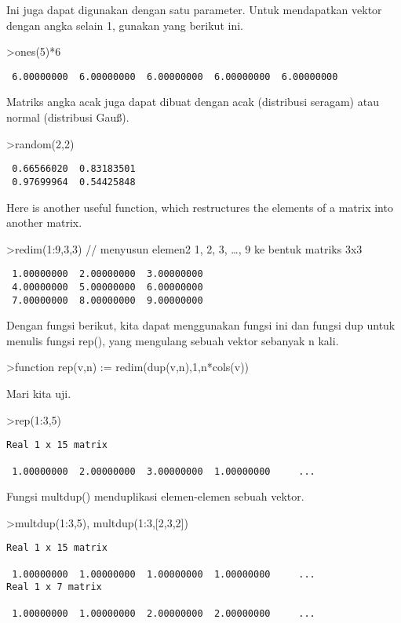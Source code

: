 \documentclass[
]{book}
\begin{document}
Ini juga dapat digunakan dengan satu parameter. Untuk mendapatkan vektor dengan angka selain 1, gunakan yang berikut ini.

\textgreater ones(5)*6

\begin{verbatim}
 6.00000000  6.00000000  6.00000000  6.00000000  6.00000000 
\end{verbatim}

Matriks angka acak juga dapat dibuat dengan acak (distribusi seragam) atau normal (distribusi Gauß).

\textgreater random(2,2)

\begin{verbatim}
 0.66566020  0.83183501 
 0.97699964  0.54425848 
\end{verbatim}

Here is another useful function, which restructures the elements of a matrix into another matrix.

\textgreater redim(1:9,3,3) // menyusun elemen2 1, 2, 3, \ldots, 9 ke bentuk matriks 3x3

\begin{verbatim}
 1.00000000  2.00000000  3.00000000 
 4.00000000  5.00000000  6.00000000 
 7.00000000  8.00000000  9.00000000 
\end{verbatim}

Dengan fungsi berikut, kita dapat menggunakan fungsi ini dan fungsi dup untuk menulis fungsi rep(), yang mengulang sebuah vektor sebanyak n kali.

\textgreater function rep(v,n) := redim(dup(v,n),1,n*cols(v))

Mari kita uji.

\textgreater rep(1:3,5)

\begin{verbatim}
Real 1 x 15 matrix

 1.00000000  2.00000000  3.00000000  1.00000000     ...
\end{verbatim}

Fungsi multdup() menduplikasi elemen-elemen sebuah vektor.

\textgreater multdup(1:3,5), multdup(1:3,{[}2,3,2{]})

\begin{verbatim}
Real 1 x 15 matrix

 1.00000000  1.00000000  1.00000000  1.00000000     ...
Real 1 x 7 matrix

 1.00000000  1.00000000  2.00000000  2.00000000     ...
\end{verbatim}
\end{document}
